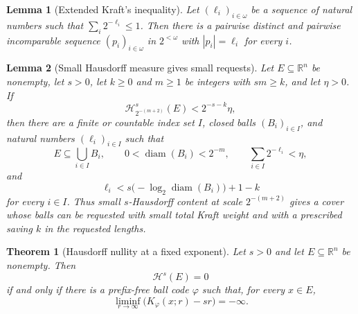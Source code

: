 \documentclass[10pt,a4paper]{amsart}
\newtheorem{lemma}{Lemma}
\newtheorem{theorem}{Theorem}
\DeclareMathOperator{\diam}{diam}
\begin{document}
\begin{lemma}[Extended Kraft's inequality]
\label{lem:kraft}
Let \((\ell_i)_{i\in\omega}\) be a sequence of natural numbers such that
\(\sum_{i}2^{-\ell_i}\le 1\).
Then there is a pairwise distinct and pairwise incomparable sequence
\((p_i)_{i\in\omega}\) in \(2^{<\omega}\) with \(|p_i|=\ell_i\) for every
\(i\).
\end{lemma}

\begin{lemma}[Small Hausdorff measure gives small requests]
\label{lem:hausdorff-requests}
Let \(E\subseteq\mathbb R^n\) be nonempty, let \(s>0\), let \(k\ge0\) and
\(m\ge1\) be integers with \(sm\ge k\), and let \(\eta>0\).  If
\[
\mathcal H^s_{2^{-(m+2)}}(E)<2^{-s-k}\eta,
\]
then there are a finite or countable index set \(I\), closed balls
\((B_i)_{i\in I}\), and natural numbers \((\ell_i)_{i\in I}\) such that
\[
E\subseteq\bigcup_{i\in I} B_i,
\qquad
0<\diam(B_i)<2^{-m},
\qquad
\sum_{i\in I}2^{-\ell_i}<\eta,
\]
and
\[
\ell_i<s\bigl(-\log_2\diam(B_i)\bigr)+1-k
\]
for every \(i\in I\).  Thus small \(s\)-Hausdorff content at scale
\(2^{-(m+2)}\) gives a cover whose balls can be requested with small total
Kraft weight and with a prescribed saving \(k\) in the requested lengths.
\end{lemma}

\begin{theorem}[Hausdorff nullity at a fixed exponent]
\label{thm:fixed-s-hausdorff-null-code}
Let \(s>0\) and let \(E\subseteq\mathbb R^n\) be nonempty.  Then
\[
\mathcal H^s(E)=0
\]
if and only if there is a prefix-free ball code \(\varphi\) such that, for every
\(x\in E\),
\[
\liminf_{r\to\infty}\bigl(K_\varphi(x;r)-sr\bigr)=-\infty.
\]
\end{theorem}
\end{document}
